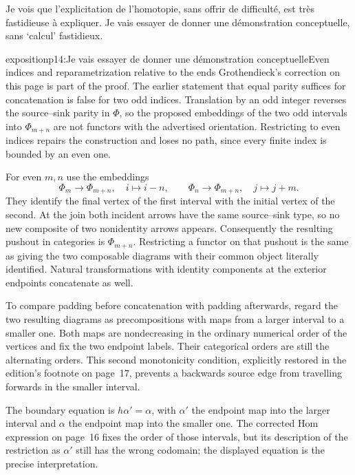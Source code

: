 Je vois que l'explicitation de l'homotopie, sans offrir de difficulté, est très fastidieuse à expliquer. Je vais essayer de donner une démonstration conceptuelle, sans `calcul' fastidieux.

\begin{dcomment}{exposition}{p14:Je vais essayer de donner une démonstration conceptuelle}{Even indices and reparametrization relative to the ends}
Grothendieck's correction on this page is part of the proof. The earlier statement that equal parity suffices for concatenation is false for two odd indices. Translation by an odd integer reverses the source--sink parity in $\Phi$, so the proposed embeddings of the two odd intervals into $\Phi_{m+n}$ are not functors with the advertised orientation. Restricting to even indices repairs the construction and loses no path, since every finite index is bounded by an even one.

For even $m,n$ use the embeddings
\[
 \Phi_m\longrightarrow\Phi_{m+n},\quad i\longmapsto i-n,
 \qquad
 \Phi_n\longrightarrow\Phi_{m+n},\quad j\longmapsto j+m.
\]
They identify the final vertex of the first interval with the initial vertex of the second. At the join both incident arrows have the same source--sink type, so no new composite of two nonidentity arrows appears. Consequently the resulting pushout in categories is $\Phi_{m+n}$. Restricting a functor on that pushout is the same as giving the two composable diagrams with their common object literally identified. Natural transformations with identity components at the exterior endpoints concatenate as well.

To compare padding before concatenation with padding afterwards, regard the two resulting diagrams as precompositions with maps from a larger interval to a smaller one. Both maps are nondecreasing in the ordinary numerical order of the vertices and fix the two endpoint labels. Their categorical orders are still the alternating orders. This second monotonicity condition, explicitly restored in the edition's footnote on page~17, prevents a backwards source edge from travelling forwards in the smaller interval.

The boundary equation is $h\alpha'=\alpha$, with $\alpha'$ the endpoint map into the larger interval and $\alpha$ the endpoint map into the smaller one. The corrected Hom expression on page~16 fixes the order of those intervals, but its description of the restriction as $\alpha'$ still has the wrong codomain; the displayed equation is the precise interpretation.


\end{dcomment}
